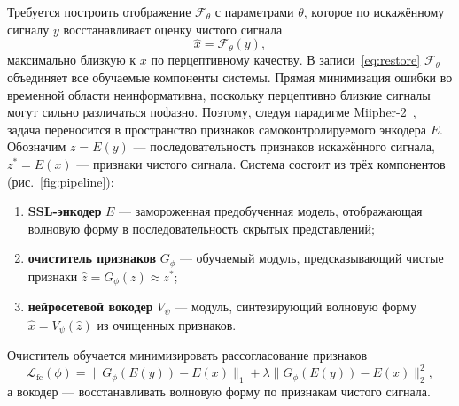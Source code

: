 Требуется построить отображение $\mathcal{F}_\theta$ с параметрами $\theta$,
которое по искажённому сигналу $y$ восстанавливает оценку чистого сигнала
\begin{equation}
    \hat{x} = \mathcal{F}_\theta(y),
    \label{eq:restore}
\end{equation}
максимально близкую к $x$ по перцептивному качеству. В записи~\eqref{eq:restore}
$\mathcal{F}_\theta$ объединяет все обучаемые компоненты системы. Прямая
минимизация ошибки
во временной области неинформативна, поскольку перцептивно близкие сигналы могут
сильно различаться пофазно. Поэтому, следуя парадигме
Miipher-2~\cite{miipher2}, задача переносится в пространство признаков
самоконтролируемого энкодера $E$. Обозначим $z = E(y)$ --- последовательность
признаков искажённого сигнала, $z^{\ast} = E(x)$ --- признаки чистого сигнала.
Система состоит из трёх компонентов (рис.~\ref{fig:pipeline}):
\begin{enumerate}
    \item \textbf{SSL-энкодер} $E$ --- замороженная предобученная модель,
        отображающая волновую форму в последовательность скрытых представлений;
    \item \textbf{очиститель признаков} $G_\phi$ --- обучаемый модуль,
        предсказывающий чистые признаки $\hat{z} = G_\phi(z) \approx z^{\ast}$;
    \item \textbf{нейросетевой вокодер} $V_\psi$ --- модуль, синтезирующий
        волновую форму $\hat{x} = V_\psi(\hat{z})$ из очищенных признаков.
\end{enumerate}

Очиститель обучается минимизировать рассогласование признаков
\begin{equation}
    \mathcal{L}_{\text{fc}}(\phi) =
    \big\| G_\phi(E(y)) - E(x) \big\|_1 +
    \lambda \big\| G_\phi(E(y)) - E(x) \big\|_2^2,
    \label{eq:fcloss}
\end{equation}
а вокодер --- восстанавливать волновую форму по признакам чистого сигнала.

